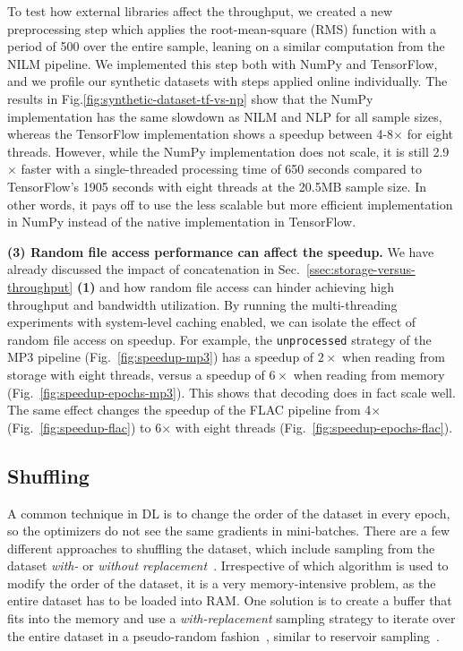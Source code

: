 {To test how external libraries affect the throughput, we created a new preprocessing step which applies the root-mean-square (RMS) function with a period of 500 over the entire sample, leaning on a similar computation from the NILM pipeline.
We implemented this step both with NumPy and TensorFlow, and we profile our synthetic datasets with steps applied online individually.
The results in Fig.\ref{fig:synthetic-dataset-tf-vs-np} show that the NumPy implementation has the same slowdown as NILM and NLP for all sample sizes, whereas the TensorFlow implementation shows a speedup between 4-8$\times$ for eight threads.
However, while the NumPy implementation does not scale, it is still 2.9$\times$ faster with a single-threaded processing time of 650 seconds compared to TensorFlow's 1905 seconds with eight threads at the 20.5\:MB sample size.
In other words, it pays off to use the less scalable but more efficient implementation in NumPy instead of the native implementation in TensorFlow.

}

{\color{diff}

\textbf{(3) Random file access performance can affect the speedup. }
We have already discussed the impact of concatenation in Sec.~\ref{ssec:storage-versus-throughput} \textbf{(1)} and how random file access can hinder achieving high throughput and bandwidth utilization.
By running the multi-threading experiments with system-level caching enabled, we can isolate the effect of random file access on speedup.
For example, the \texttt{unprocessed} strategy of the MP3 pipeline (Fig.~\ref{fig:speedup-mp3}) has a speedup of $2\times$ when reading from storage with eight threads, versus a speedup of $6\times$ when reading from memory (Fig.~\ref{fig:speedup-epochs-mp3}).
This shows that decoding does in fact scale well.
The same effect changes the speedup of the FLAC pipeline from 4$\times$ (Fig.~\ref{fig:speedup-flac}) to 6$\times$ with eight threads (Fig.~\ref{fig:speedup-epochs-flac}).

}

\subsection{Shuffling}
\label{ssec:shuffling}

A common technique in DL is to change the order of the dataset in every epoch, so the optimizers do not see the same gradients in mini-batches.
There are a few different approaches to shuffling the dataset, which include sampling from the dataset \textit{with-} or \textit{without replacement}~\cite{de2020random,haochen2019random,yun2021singleshuffle}.
Irrespective of which algorithm is used to modify the order of the dataset, it is a very memory-intensive problem, as the entire dataset has to be loaded into RAM.
One solution is to create a buffer that fits into the memory and use a \textit{with-replacement} sampling strategy to iterate over the entire dataset in a pseudo-random fashion~\cite{tfdatasetapishuffle}, similar to reservoir sampling~\cite{10.1145/3147.3165}.

